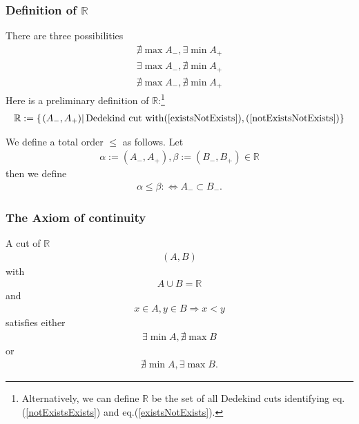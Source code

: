 \documentclass[11pt]{book}
\begin{document}
\subsubsection{Definition of $\mathbb{R}$}
There are three possibilities
\begin{eqnarray}
\label{notExistsExists}
\nexists \max A_-, \exists \min A_+ \\
\label{existsNotExists}
\exists \max A_-, \nexists \min A_+ \\
\label{notExistsNotExists}
\nexists \max A_-,  \nexists \min A_+ 
\end{eqnarray}
Here is a preliminary definition of $\mathbb{R}$:\footnote{
Alternatively, we can define $\mathbb{R}$ be the set of all Dedekind cuts identifying eq.(\ref{notExistsExists}) and eq.(\ref{existsNotExists}).
}
\begin{eqnarray}
\mathbb{R} := \left\{\left. (A_-, A_+) \right| \text{Dedekind cut with} (\ref{existsNotExists}), (\ref{notExistsNotExists})\right\}
\end{eqnarray}

We define a total order $\leq$ as follows.
Let 
\begin{eqnarray}
\alpha := (A_-, A_+), \beta := (B_-, B_+) \in \mathbb{R}
\end{eqnarray}
then we define
\begin{eqnarray}
\alpha \leq \beta :\Leftrightarrow A_- \subset B_-.
\end{eqnarray}

\subsubsection{The Axiom of continuity}
A cut of $\mathbb{R}$
\begin{eqnarray}
(A,B)
\end{eqnarray}
with
\begin{eqnarray}
A \cup B = \mathbb{R}
\end{eqnarray}
and
\begin{eqnarray}
x \in A, y \in B \Rightarrow x < y
\end{eqnarray}
satisfies either
\begin{eqnarray}
\exists \min A, \nexists \max B
\end{eqnarray}
or
\begin{eqnarray}
\nexists \min A, \exists \max B.
\end{eqnarray}
\end{document}
